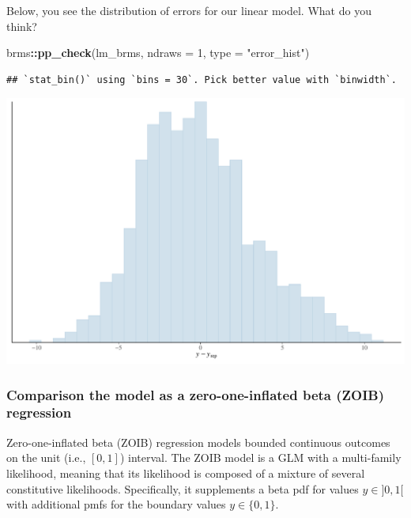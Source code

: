 \documentclass[
  11pt,
]{article}
\newenvironment{Shaded}{\begin{snugshade}}{\end{snugshade}}
\newcommand{\AttributeTok}[1]{\textcolor[rgb]{0.13,0.29,0.53}{#1}}
\newcommand{\DecValTok}[1]{\textcolor[rgb]{0.00,0.00,0.81}{#1}}
\newcommand{\FunctionTok}[1]{\textcolor[rgb]{0.13,0.29,0.53}{\textbf{#1}}}
\newcommand{\NormalTok}[1]{#1}
\newcommand{\SpecialCharTok}[1]{\textcolor[rgb]{0.81,0.36,0.00}{\textbf{#1}}}
\newcommand{\StringTok}[1]{\textcolor[rgb]{0.31,0.60,0.02}{#1}}
\begin{document}
Below, you see the distribution of errors for our linear model. What do you think?

\begin{Shaded}
\begin{Highlighting}[]
\NormalTok{brms}\SpecialCharTok{::}\FunctionTok{pp\_check}\NormalTok{(lm\_brms, }\AttributeTok{ndraws =} \DecValTok{1}\NormalTok{, }\AttributeTok{type =} \StringTok{"error\_hist"}\NormalTok{)}
\end{Highlighting}
\end{Shaded}

\begin{verbatim}
## `stat_bin()` using `bins = 30`. Pick better value with `binwidth`.
\end{verbatim}

\begin{center}\includegraphics{02-02-lec_files/figure-latex/brms-lm-pp-2-1} \end{center}

\hypertarget{comparison-the-model-as-a-zero-one-inflated-beta-zoib-regression}{%
\subsubsection{Comparison the model as a zero-one-inflated beta (ZOIB) regression}\label{comparison-the-model-as-a-zero-one-inflated-beta-zoib-regression}}

Zero-one-inflated beta (ZOIB) regression models bounded continuous outcomes on the
unit (i.e., \([0,1]\)) interval.
The ZOIB model is a GLM with a multi-family likelihood, meaning
that its likelihood is composed of a mixture of several constitutive likelihoods.
Specifically, it supplements a beta pdf for values \(y \in ]0, 1[\) with
additional pmfs for the boundary values \(y \in \{0,1\}\).
\end{document}
